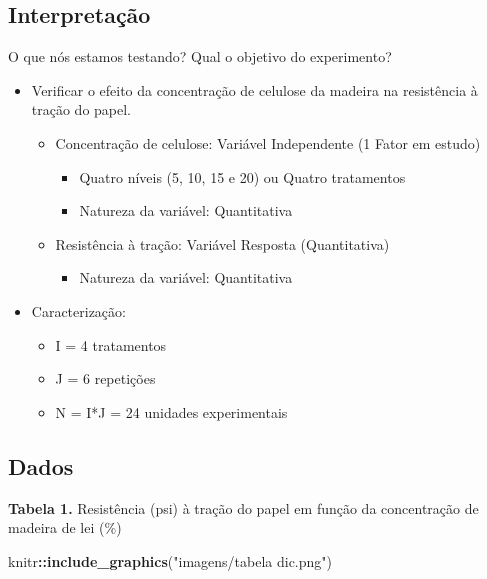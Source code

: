 \documentclass[
]{book}
\newenvironment{Shaded}{\begin{snugshade}}{\end{snugshade}}
\newcommand{\FunctionTok}[1]{\textcolor[rgb]{0.13,0.29,0.53}{\textbf{#1}}}
\newcommand{\NormalTok}[1]{#1}
\newcommand{\SpecialCharTok}[1]{\textcolor[rgb]{0.81,0.36,0.00}{\textbf{#1}}}
\newcommand{\StringTok}[1]{\textcolor[rgb]{0.31,0.60,0.02}{#1}}
\providecommand{\tightlist}{%
  \setlength{\itemsep}{0pt}\setlength{\parskip}{0pt}}
\begin{document}
\subsection{Interpretação}\label{interpretauxe7uxe3o}

O que nós estamos testando? Qual o objetivo do experimento?

\begin{itemize}
\tightlist
\item
  Verificar o efeito da concentração de celulose da madeira na resistência à tração do papel.

  \begin{itemize}
  \tightlist
  \item
    Concentração de celulose: Variável Independente (1 Fator em estudo)

    \begin{itemize}
    \tightlist
    \item
      Quatro níveis (5, 10, 15 e 20) ou Quatro tratamentos
    \item
      Natureza da variável: Quantitativa
    \end{itemize}
  \item
    Resistência à tração: Variável Resposta (Quantitativa)

    \begin{itemize}
    \tightlist
    \item
      Natureza da variável: Quantitativa
    \end{itemize}
  \end{itemize}
\item
  Caracterização:

  \begin{itemize}
  \tightlist
  \item
    I = 4 tratamentos
  \item
    J = 6 repetições
  \item
    N = I*J = 24 unidades experimentais
  \end{itemize}
\end{itemize}

\subsection{Dados}\label{dados}

\textbf{Tabela 1.} Resistência (psi) à tração do papel em função da concentração de madeira de lei (\%)

\begin{Shaded}
\begin{Highlighting}[]
\NormalTok{knitr}\SpecialCharTok{::}\FunctionTok{include\_graphics}\NormalTok{(}\StringTok{"imagens/tabela dic.png"}\NormalTok{)}
\end{Highlighting}
\end{Shaded}
\end{document}
